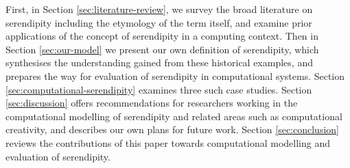 First, in
Section \ref{sec:literature-review}, we survey the broad literature on
serendipity including the etymology of the term itself, and examine prior applications of the concept of serendipity in a computing context.  Then in Section \ref{sec:our-model} we present our own
definition of serendipity, which synthesises the understanding gained from these historical examples, and prepares the way for evaluation of serendipity in computational systems.  Section
\ref{sec:computational-serendipity} examines
three such case studies.  Section
\ref{sec:discussion} offers recommendations for researchers working in the computational modelling of serendipity and related areas such as computational creativity, and describes our own plans for future
work.  Section \ref{sec:conclusion} reviews the contributions of this paper towards computational modelling and evaluation of serendipity.  


